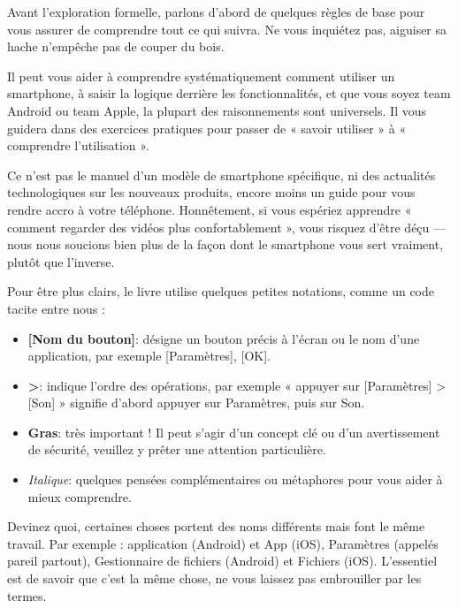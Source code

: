 
Avant l'exploration formelle, parlons d'abord de quelques règles de base pour vous assurer de comprendre tout ce qui suivra. Ne vous inquiétez pas, aiguiser sa hache n'empêche pas de couper du bois.


Il peut vous aider à comprendre systématiquement comment utiliser un smartphone, à saisir la logique derrière les fonctionnalités, et que vous soyez team Android ou team Apple, la plupart des raisonnements sont universels. Il vous guidera dans des exercices pratiques pour passer de « savoir utiliser » à « comprendre l'utilisation ».

Ce n'est pas le manuel d'un modèle de smartphone spécifique, ni des actualités technologiques sur les nouveaux produits, encore moins un guide pour vous rendre accro à votre téléphone. Honnêtement, si vous espériez apprendre « comment regarder des vidéos plus confortablement », vous risquez d'être déçu — nous nous soucions bien plus de la façon dont le smartphone vous sert vraiment, plutôt que l'inverse.


Pour être plus clairs, le livre utilise quelques petites notations, comme un code tacite entre nous :

\begin{itemize}
  \item \textbf{[Nom du bouton]}: désigne un bouton précis à l'écran ou le nom d'une application, par exemple [Paramètres], [OK].
  \item \textbf{>}: indique l'ordre des opérations, par exemple « appuyer sur [Paramètres] > [Son] » signifie d'abord appuyer sur Paramètres, puis sur Son.
  \item \textbf{Gras}: très important ! Il peut s'agir d'un concept clé ou d'un avertissement de sécurité, veuillez y prêter une attention particulière.
  \item \emph{Italique}: quelques pensées complémentaires ou métaphores pour vous aider à mieux comprendre.
\end{itemize}


Devinez quoi, certaines choses portent des noms différents mais font le même travail. Par exemple : application (Android) et App (iOS), Paramètres (appelés pareil partout), Gestionnaire de fichiers (Android) et Fichiers (iOS). L'essentiel est de savoir que c'est la même chose, ne vous laissez pas embrouiller par les termes.

